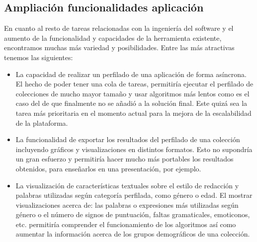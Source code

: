 \subsection{Ampliación funcionalidades aplicación}
En cuanto al resto de tareas relacionadas con la ingeniería del software y el aumento de la funcionalidad y capacidades de la herramienta existente, encontramos muchas más variedad y posibilidades. Entre las más atractivas tenemos las siguientes:
\begin{itemize}
    \item La capacidad de realizar un perfilado de una aplicación de forma asíncrona. El hecho de poder tener una cola de tareas, permitiría ejecutar el perfilado de colecciones de mucho mayor tamaño y usar algoritmos más lentos como es el caso del de \citet{loscalis22} que finalmente no se añadió a la solución final. Este quizá sea la tarea más prioritaria en el momento actual para la mejora de la escalabilidad de la plataforma.
    \item La funcionalidad de exportar los resultados del perfilado de una colección incluyendo gráficos y visualizaciones en distintos formatos. Esto no supondría un gran esfuerzo y permitiría hacer mucho más portables los resultados obtenidos, para enseñarlos en una presentación, por ejemplo.
    \item La visualización de características textuales sobre el estilo de redacción y palabras utilizadas según categoría perfilada, como género o edad. El mostrar visualizaciones acerca de: las palabras o expresiones más utilizadas según género o el número de signos de puntuación, faltas gramaticales, emoticonos, etc. permitiría comprender el funcionamiento de los algoritmos así como aumentar la información acerca de los grupos demográficos de una colección.
\end{itemize}

